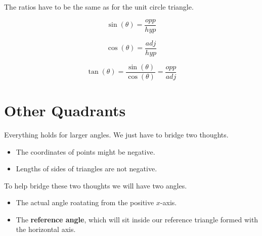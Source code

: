 \documentclass{ximera}
\begin{document}
\begin{image}[3in]
  \end{image}


The ratios have to be the same as for the unit circle triangle.


\[   \sin(\theta) = \frac{opp}{hyp}           \]



\[   \cos(\theta) = \frac{adj}{hyp}           \]




\[   \tan(\theta) = \frac{\sin(\theta)}{\cos(\theta)}    = \frac{opp}{adj}        \]








\section{Other Quadrants}


Everything holds for larger angles.  We just have to bridge two thoughts.  


\begin{itemize}
\item The coordinates of points might be negative.  
\item Lengths of sides of triangles are not negative.
\end{itemize}

To help bridge these two thoughts we will have two angles.  


\begin{itemize}
\item The actual angle roatating from the positive $x$-axis.  
\item The \textbf{reference angle}, which will sit inside our reference triangle formed with the horizontal axis.
\end{itemize}
\end{document}
